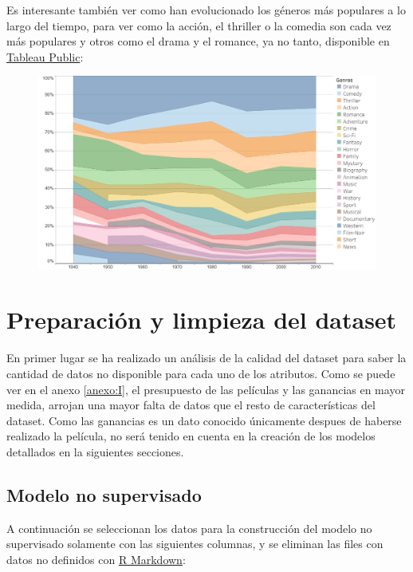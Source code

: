 \documentclass{article}
\begin{document}
Es interesante también ver como han evolucionado los géneros más populares a lo largo del tiempo, para ver como la acción, el thriller o la comedia son cada vez más populares y otros como el drama y el romance, ya no tanto, disponible en \href{https://public.tableau.com/profile/javier6580\#!/vizhome/proyecto_fin_de_master_genre/rating_genre}{Tableau Public}:

\begin{figure}[h]
\centering
\includegraphics[width=4.5in,clip,keepaspectratio]{./images/genre_year}
\end{figure}

\clearpage

\section{Preparación y limpieza del dataset}

En primer lugar se ha realizado un análisis de la calidad del dataset para saber la cantidad de datos no disponible para cada uno de los atributos. Como se puede ver en el anexo \ref{anexo:I}, el presupuesto de las películas y las ganancias en mayor medida, arrojan una mayor falta de datos que el resto de características del dataset. Como las ganancias es un dato conocido únicamente despues de haberse realizado la película, no será tenido en cuenta en la creación de los modelos detallados en la siguientes secciones. 

\subsection{Modelo no supervisado}

A continuación se seleccionan los datos para la construcción del modelo no supervisado solamente con las siguientes columnas, y se eliminan las files con datos no definidos con \href{https://github.com/pozueco/proyecto_fin_de_master/blob/master/clean_dataset.md}{R Markdown}:
\end{document}
